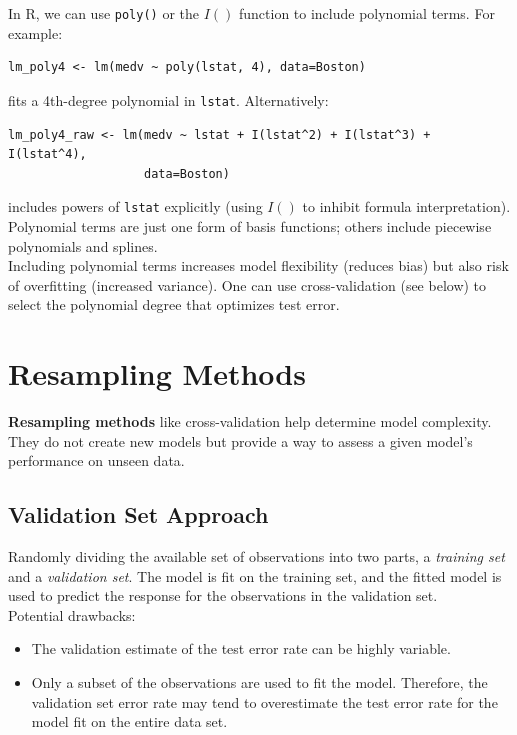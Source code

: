 \documentclass[11pt]{article}
\begin{document}
\noindent In R, we can use \texttt{poly()} or the $I()$ function to include polynomial terms. For example:
\begin{verbatim}
lm_poly4 <- lm(medv ~ poly(lstat, 4), data=Boston)
\end{verbatim}
fits a 4th-degree polynomial in \texttt{lstat}. Alternatively:
\begin{verbatim}
lm_poly4_raw <- lm(medv ~ lstat + I(lstat^2) + I(lstat^3) + I(lstat^4),
                   data=Boston)
\end{verbatim}
includes powers of \texttt{lstat} explicitly (using $I()$ to inhibit formula interpretation). Polynomial terms are just one form of basis functions; others include piecewise polynomials and splines. \\

\noindent Including polynomial terms increases model flexibility (reduces bias) but also risk of overfitting (increased variance). One can use cross-validation (see below) to select the polynomial degree that optimizes test error. \\

\newpage

\section{Resampling Methods}

\noindent \textbf{Resampling methods} like cross-validation help determine model complexity. They do not create new models but provide a way to assess a given model’s performance on unseen data. \\

\subsection{Validation Set Approach}
\noindent Randomly dividing the available set of observations into two parts, a \textit{training set} and a \textit{validation set}. The model is fit on the training set, and the fitted model is used to predict the response for the observations in the validation set. \\

\noindent Potential drawbacks:
\begin{itemize}
    \item The validation estimate of the test error rate can be highly variable.
    \item Only a subset of the observations are used to fit the model. Therefore, the validation set error rate may tend to overestimate the test error rate for the model fit on the entire data set.
\end{itemize}
\end{document}
